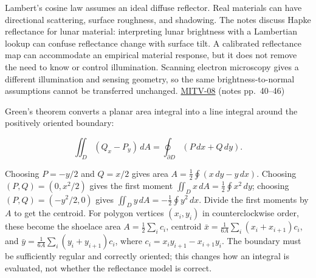 \hypertarget{04-visual-computing-ii-ch032-reflectance-models-matter-lunar-soil-and-electron-microscopy}{}

Lambert's cosine law assumes an ideal diffuse reflector. Real materials can have directional scattering, surface roughness, and shadowing. The notes discuss Hapke reflectance for lunar material: interpreting lunar brightness with a Lambertian lookup can confuse reflectance change with surface tilt. A calibrated reflectance map can accommodate an empirical material response, but it does not remove the need to know or control illumination. Scanning electron microscopy gives a different illumination and sensing geometry, so the same brightness-to-normal assumptions cannot be transferred unchanged. \hyperref[04-visual-computing-ii-ch036-mitv-08---shading-special-cases-lunar-surface-scanning-electron-microscope-greens-theorem]{MITV-08} (notes pp.~40--46)

Green's theorem converts a planar area integral into a line integral around the positively oriented boundary:

\[
\iint_D (Q_x-P_y)\,dA=\oint_{\partial D}(P\,dx+Q\,dy).
\]

Choosing \(P=-y/2\) and \(Q=x/2\) gives area \(A=\tfrac12\oint(x\,dy-y\,dx)\). Choosing \((P,Q)=(0,x^2/2)\) gives the first moment \(\iint_Dx\,dA=\tfrac12\oint x^2\,dy\); choosing \((P,Q)=(-y^2/2,0)\) gives \(\iint_Dy\,dA=-\tfrac12\oint y^2\,dx\). Divide the first moments by \(A\) to get the centroid. For polygon vertices \((x_i,y_i)\) in counterclockwise order, these become the shoelace area \(A=\tfrac12\sum_i c_i\), centroid \(\bar x=\frac{1}{6A}\sum_i(x_i+x_{i+1})c_i\), and \(\bar y=\frac{1}{6A}\sum_i(y_i+y_{i+1})c_i\), where \(c_i=x_i y_{i+1}-x_{i+1}y_i\). The boundary must be sufficiently regular and correctly oriented; this changes how an integral is evaluated, not whether the reflectance model is correct.

